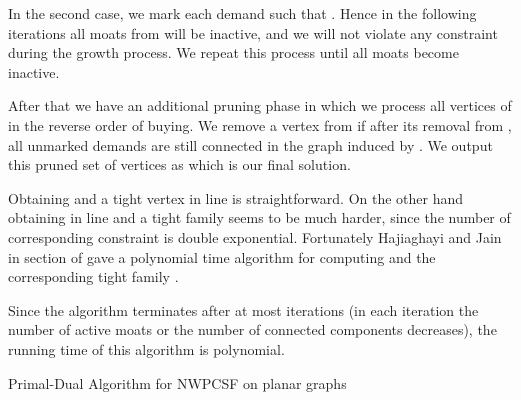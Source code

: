 In the second case, we mark each demand  such that . Hence in the following iterations all moats from  will be inactive, and we will not violate any constraint during the growth process. We repeat this process until all moats become inactive.

After that we have an additional pruning phase in which we process all vertices of  in the reverse order of buying. We remove a vertex  from  if after its removal from , all unmarked demands are still connected in the graph induced by . We output this pruned set of vertices as  which is our final solution.

Obtaining  and a tight vertex in line  is straightforward. On the other hand obtaining  in line  and a tight family  seems to be much harder, since the number of corresponding constraint is double exponential. Fortunately Hajiaghayi and Jain in section  of \cite{Hajiaghayi} gave a polynomial time algorithm for computing  and the corresponding tight family .

Since the algorithm terminates after at most  iterations (in each iteration the number of active moats or the number of connected components decreases), the running time of this algorithm is polynomial.

\begin{algorithm}[H]
	\BlankLine
	\caption{Primal-Dual Algorithm for NWPCSF on planar graphs}
\end{algorithm}



